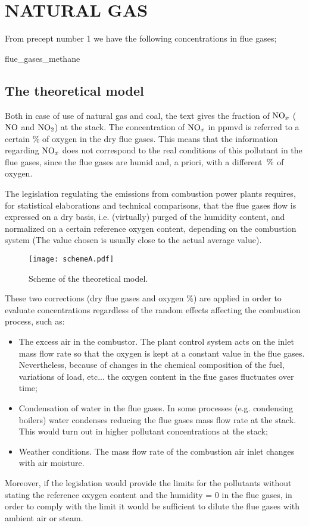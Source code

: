 \documentclass[a4paper,12pt]{article}
\begin{document}
\section{NATURAL GAS}
From precept number 1 we have the following concentrations in flue gases;

{flue_gases_methane}

\subsection*{The theoretical model}
Both	in	case	of	use	of	natural	gas	and	coal,	the	text	gives	the	fraction	of	$\text{NO}_x$	($\text{NO}$	and	$\text{NO}_2$)	at	the	stack.	The	concentration	of	$\text{NO}_x$	in	ppmvd	is	referred	to	a	certain	\%	of	oxygen	in	the	dry	flue	gases.	This	means	that	the	information	regarding	$\text{NO}_x$	does	not	correspond	to	the	real	conditions	of	this	pollutant	in	the	flue	gases,	since	the	flue	gases	are	humid	and,	a	priori,	with	a	different	$\,\%$	of	oxygen.	

The	legislation	regulating	the	emissions	from	combustion	power	plants	requires,	for	statistical	elaborations	and	technical	comparisons,	that	the	flue	gases	flow	is	expressed	on	a	dry	basis,	i.e.	(virtually)	purged	of	the	humidity	content,	and	normalized	on	a	certain	reference	oxygen	content,	depending	on	the	combustion	system	(The	value	chosen	is	usually	close	to	the	actual	average	value).
%
\begin{figure}[H]
	\centering
    \texttt{[image: schemeA.pdf]}
    \caption{Scheme of the theoretical model.}
\end{figure}
%
These	two	corrections	(dry	flue	gases	and	oxygen \%)	are	applied	in	order	to	evaluate	concentrations	regardless	of	the	random	effects	affecting	the	combustion	process,	such	as:
\begin{itemize}
\item The	excess	air	in	the	combustor.	The	plant	control	system	acts	on	the	inlet	mass	flow	rate	so	that	the	oxygen	is	kept	at	a	constant	value	in	the	flue	gases.	Nevertheless,	because	of	changes	in	the	chemical	composition	of	the	fuel,	variations	of	load,	etc...	the	oxygen	content	in	the	flue	gases	fluctuates	over	time;
\item Condensation	of	water	in	the	flue	gases.	In	some	processes	(e.g.	condensing	boilers)	water	condenses	reducing	the	flue	gases	mass	flow	rate	at	the	stack.	This	would	turn	out	in	higher	pollutant	concentrations	at	the	stack;
\item Weather	conditions.	The	mass	flow	rate	of	the	combustion	air	inlet	changes	with	air	moisture.
\end{itemize}
Moreover, if the legislation would provide the limits for the pollutants without stating the reference oxygen content and the humidity = 0 in the flue gases, in order to comply with the limit it would be sufficient to dilute the flue gases with ambient air or steam.  
\end{document}
